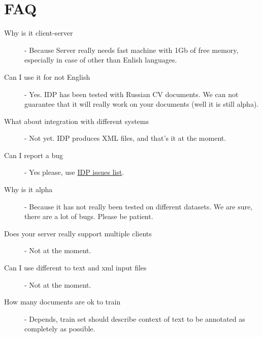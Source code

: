 \documentclass[12pt]{article}
\begin{document}
\section{FAQ}
\begin{description}
	\item[Why is it client-server] - Because Server really needs fast machine with 1Gb of free memory, especially in case of other than Enlish languages.
        \item[Can I use it for not English] - Yes. IDP has been tested with Russian CV documents. We can not guarantee that it will really work on your documents (well it is still alpha).
        \item[What about integration with different systems] - Not yet. IDP produces XML files, and that's it at the moment.
        \item[Can I report a bug] - Yes please, use \href{http://code.google.com/p/idp/issues/list}{IDP issues list}.
        \item[Why is it alpha] - Because it has not really been tested on different datasets. We are sure, there are a lot of bugs. Please be patient.
        \item[Does your server really support multiple clients] - Not at the moment.
        \item[Can I use different to text and xml input files] - Not at the moment.
        \item[How many documents are ok to train] - Depends, train set should describe context of text to be annotated as completely as possible.
\end{description}
\end{document}
